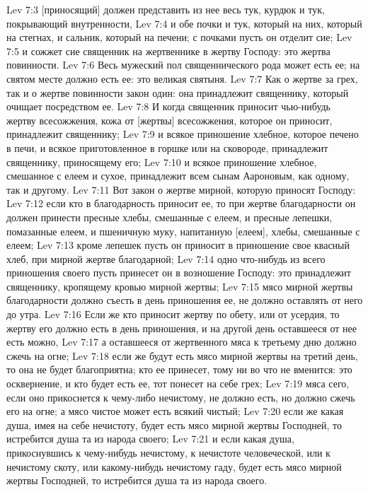 Lev 7:3  [приносящий] должен представить из нее весь тук, курдюк и тук, покрывающий внутренности,
Lev 7:4  и обе почки и тук, который на них, который на стегнах, и сальник, который на печени; с почками пусть он отделит сие;
Lev 7:5  и сожжет сие священник на жертвеннике в жертву Господу: это жертва повинности.
Lev 7:6  Весь мужеский пол священнического рода может есть ее; на святом месте должно есть ее: это великая святыня.
Lev 7:7  Как о жертве за грех, так и о жертве повинности закон один: она принадлежит священнику, который очищает посредством ее.
Lev 7:8  И когда священник приносит чью-нибудь жертву всесожжения, кожа от [жертвы] всесожжения, которое он приносит, принадлежит священнику;
Lev 7:9  и всякое приношение хлебное, которое печено в печи, и всякое приготовленное в горшке или на сковороде, принадлежит священнику, приносящему его;
Lev 7:10  и всякое приношение хлебное, смешанное с елеем и сухое, принадлежит всем сынам Аароновым, как одному, так и другому.
Lev 7:11  Вот закон о жертве мирной, которую приносят Господу:
Lev 7:12  если кто в благодарность приносит ее, то при жертве благодарности он должен принести пресные хлебы, смешанные с елеем, и пресные лепешки, помазанные елеем, и пшеничную муку, напитанную [елеем], хлебы, смешанные с елеем;
Lev 7:13  кроме лепешек пусть он приносит в приношение свое квасный хлеб, при мирной жертве благодарной;
Lev 7:14  одно что-нибудь из всего приношения своего пусть принесет он в возношение Господу: это принадлежит священнику, кропящему кровью мирной жертвы;
Lev 7:15  мясо мирной жертвы благодарности должно съесть в день приношения ее, не должно оставлять от него до утра.
Lev 7:16  Если же кто приносит жертву по обету, или от усердия, то жертву его должно есть в день приношения, и на другой день оставшееся от нее есть можно,
Lev 7:17  а оставшееся от жертвенного мяса к третьему дню должно сжечь на огне;
Lev 7:18  если же будут есть мясо мирной жертвы на третий день, то она не будет благоприятна; кто ее принесет, тому ни во что не вменится: это осквернение, и кто будет есть ее, тот понесет на себе грех;
Lev 7:19  мяса сего, если оно прикоснется к чему-либо нечистому, не должно есть, но должно сжечь его на огне; а мясо чистое может есть всякий чистый;
Lev 7:20  если же какая душа, имея на себе нечистоту, будет есть мясо мирной жертвы Господней, то истребится душа та из народа своего;
Lev 7:21  и если какая душа, прикоснувшись к чему-нибудь нечистому, к нечистоте человеческой, или к нечистому скоту, или какому-нибудь нечистому гаду, будет есть мясо мирной жертвы Господней, то истребится душа та из народа своего.
